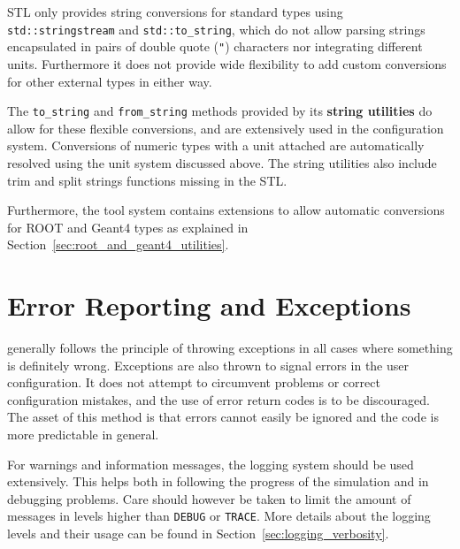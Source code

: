 \label{sec:string_utilities}
STL only provides string conversions for standard types using \texttt{std::stringstream} and \texttt{std::to\_string}, which do not allow parsing strings encapsulated in pairs of double quote (\texttt{"}) characters nor integrating different units.
Furthermore it does not provide wide flexibility to add custom conversions for other external types in either way.

The \apsq \texttt{to\_string} and \texttt{from\_string} methods provided by its \textbf{string utilities} do allow for these flexible conversions, and are extensively used in the configuration system.
Conversions of numeric types with a unit attached are automatically resolved using the unit system discussed above.
The string utilities also include trim and split strings functions missing in the STL.

Furthermore, the \apsq tool system contains extensions to allow automatic conversions for ROOT and Geant4 types as explained in Section~\ref{sec:root_and_geant4_utilities}.


\section{Error Reporting and Exceptions}
\label{sec:error_reporting_exceptions}
\apsq generally follows the principle of throwing exceptions in all cases where something is definitely wrong.
Exceptions are also thrown to signal errors in the user configuration.
It does not attempt to circumvent problems or correct configuration mistakes, and the use of error return codes is to be discouraged.
The asset of this method is that errors cannot easily be ignored and the code is more predictable in general.

For warnings and information messages, the logging system should be used extensively.
This helps both in following the progress of the simulation and in debugging problems.
Care should however be taken to limit the amount of messages in levels higher than \texttt{DEBUG} or \texttt{TRACE}.
More details about the logging levels and their usage can be found in Section~\ref{sec:logging_verbosity}.

